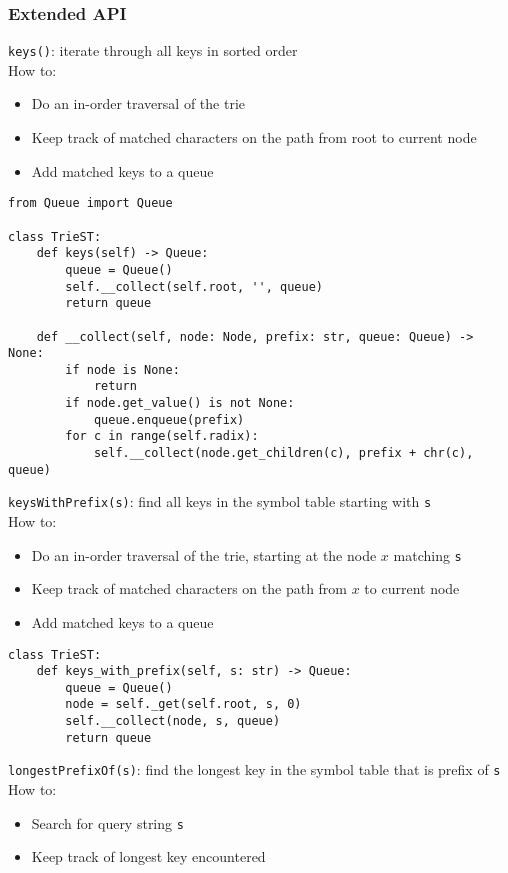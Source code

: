 \documentclass[a4paper]{article}
\begin{document}
\subsubsection*{Extended API}
\verb|keys()|: iterate through all keys in sorted order\\
How to:
\begin{itemize}
    \item Do an in-order traversal of the trie
    \item Keep track of matched characters on the path from root to current node
    \item Add matched keys to a queue
\end{itemize}

\begin{lstlisting}
from Queue import Queue

class TrieST:
    def keys(self) -> Queue:
        queue = Queue()
        self.__collect(self.root, '', queue)
        return queue

    def __collect(self, node: Node, prefix: str, queue: Queue) -> None:
        if node is None:
            return
        if node.get_value() is not None:
            queue.enqueue(prefix)
        for c in range(self.radix):
            self.__collect(node.get_children(c), prefix + chr(c), queue)
\end{lstlisting}

\verb|keysWithPrefix(s)|: find all keys in the symbol table starting with \verb|s|\\
How to:
\begin{itemize}
    \item Do an in-order traversal of the trie, starting at the node $x$ matching \verb|s|
    \item Keep track of matched characters on the path from $x$ to current node
    \item Add matched keys to a queue
\end{itemize}

\begin{lstlisting}
class TrieST:
    def keys_with_prefix(self, s: str) -> Queue:
        queue = Queue()
        node = self._get(self.root, s, 0)
        self.__collect(node, s, queue)
        return queue
\end{lstlisting}

\verb|longestPrefixOf(s)|: find the longest key in the symbol table that is prefix of \verb|s|
How to:
\begin{itemize}
    \item Search for query string \verb|s|
    \item Keep track of longest key encountered
\end{itemize}
\end{document}

